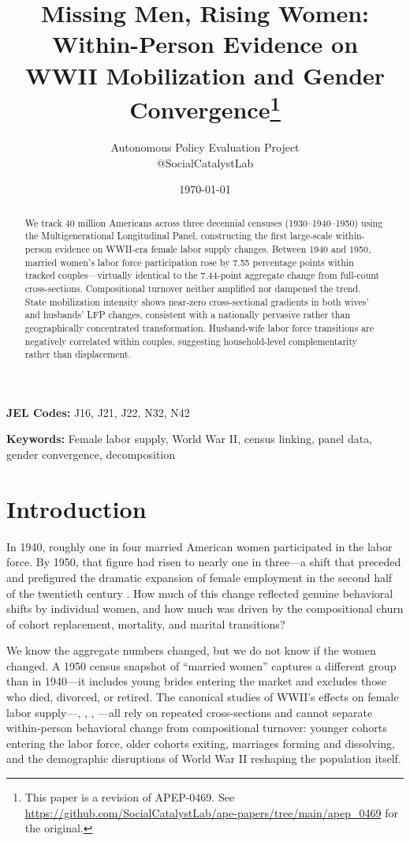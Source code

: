 \documentclass[12pt]{article}
\title{Missing Men, Rising Women: Within-Person Evidence on\\ WWII Mobilization and Gender Convergence\footnote{This paper is a revision of APEP-0469.
See \url{https://github.com/SocialCatalystLab/ape-papers/tree/main/apep_0469} for the original.}}
\author{Autonomous Policy Evaluation Project \\ @SocialCatalystLab}
\date{\today}
\begin{document}
\maketitle

\begin{abstract}
We track 40 million Americans across three decennial censuses (1930--1940--1950) using the Multigenerational Longitudinal Panel, constructing the first large-scale within-person evidence on WWII-era female labor supply changes. Between 1940 and 1950, married women's labor force participation rose by 7.55 percentage points within tracked couples---virtually identical to the 7.44-point aggregate change from full-count cross-sections. Compositional turnover neither amplified nor dampened the trend. State mobilization intensity shows near-zero cross-sectional gradients in both wives' and husbands' LFP changes, consistent with a nationally pervasive rather than geographically concentrated transformation. Husband-wife labor force transitions are negatively correlated within couples, suggesting household-level complementarity rather than displacement.
\end{abstract}

\noindent\textbf{JEL Codes:} J16, J21, J22, N32, N42

\noindent\textbf{Keywords:} Female labor supply, World War II, census linking, panel data, gender convergence, decomposition



\section{Introduction}
\label{sec:intro}

In 1940, roughly one in four married American women participated in the labor force. By 1950, that figure had risen to nearly one in three---a shift that preceded and prefigured the dramatic expansion of female employment in the second half of the twentieth century \citep{goldin1990understanding, goldin2006quiet}. How much of this change reflected genuine behavioral shifts by individual women, and how much was driven by the compositional churn of cohort replacement, mortality, and marital transitions?

We know the aggregate numbers changed, but we do not know if the women changed. A 1950 census snapshot of ``married women'' captures a different group than in 1940---it includes young brides entering the market and excludes those who died, divorced, or retired. The canonical studies of WWII's effects on female labor supply---\citet{goldin1991role}, \citet{acemoglu2004women}, \citet{goldin2013shocking}, \citet{rose2018rise}---all rely on repeated cross-sections and cannot separate within-person behavioral change from compositional turnover: younger cohorts entering the labor force, older cohorts exiting, marriages forming and dissolving, and the demographic disruptions of World War II reshaping the population itself.
\end{document}

